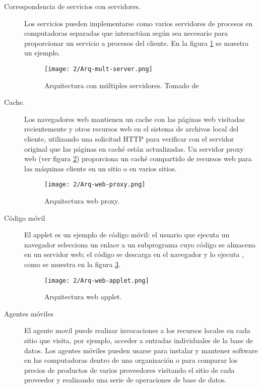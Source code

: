 \begin{description}
	\item[ Correspondencia de servicios con servidores.] Los servicios pueden implementarse como varios servidores de procesos en computadoras separadas que interactúan según sea necesario para proporcionar un servicio a procesos del cliente. En la figura \ref{fig:arq-multiserver} se muestra un ejemplo. 
	
	
	\begin{figure}[H]%
		\texttt{[image: 2/Arq-mult-server.png]}
		\caption{Arquitectura con m\'ultiples servidores. Tomado de \CO }
		\label{fig:arq-multiserver}
	\end{figure}
	
	
	\item[Cache.] Los navegadores web mantienen un \gls{cache} 
	con las páginas web visitadas recientemente y otros recursos web en el sistema de archivos local del cliente, utilizando
	una solicitud HTTP para verificar con el servidor original que las páginas en caché están actualizadas. Un \gls{servidor proxy} web (ver figura \ref{fig:arq-webproxy}) proporciona un caché compartido de recursos web para las máquinas cliente en un sitio o en varios sitios. 
	
	\begin{figure}[h]%
		\texttt{[image: 2/Arq-web-proxy.png]}
		\caption{Arquitectura web proxy. }
		\label{fig:arq-webproxy}
	\end{figure}
	
	\item[ C\'odigo m\'ovil] El \gls{applet}  es un ejemplo   de código móvil: el usuario que ejecuta un navegador selecciona un enlace a un subprograma cuyo código se almacena en un servidor web; el código se descarga en el navegador y lo ejecuta , como se muestra en la figura \ref{fig:arq-webapplet}.  
	
	\begin{figure}%
		\texttt{[image: 2/Arq-web-applet.png]}
		\caption{Arquitectura web applet.  }
		\label{fig:arq-webapplet}
	\end{figure}
	
	\item[Agentes m\'oviles] El \gls{agente movil} puede realizar   invocaciones a los recursos locales en cada sitio que visita, por ejemplo, acceder a entradas individuales de la base de datos.  
	Los agentes móviles pueden usarse para instalar y mantener software en las computadoras dentro de una organización o para comparar los precios de productos de varios proveedores 	visitando el sitio de cada proveedor y realizando una serie de operaciones de base de datos.  
\end{description} 

